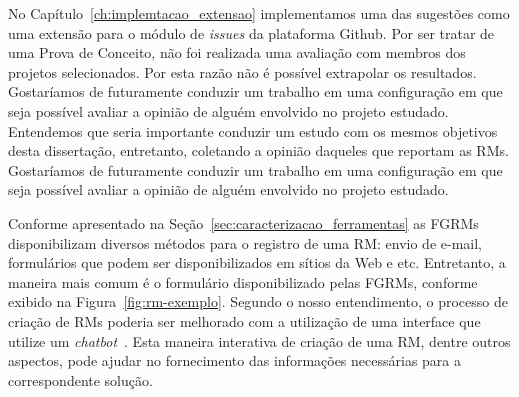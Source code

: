 No Capítulo~\ref{ch:implemtacao_extensao} implementamos uma das sugestões como
uma extensão para o módulo de \textit{issues} da plataforma Github. Por ser
tratar de uma Prova de Conceito, não foi realizada uma avaliação com membros dos
projetos selecionados. Por esta razão não é possível extrapolar os resultados.
Gostaríamos de futuramente conduzir um trabalho em uma configuração em que seja
possível avaliar a opinião de alguém envolvido no projeto estudado. Entendemos
que seria importante conduzir um estudo com os mesmos objetivos desta
dissertação, entretanto, coletando a opinião daqueles que reportam as RMs.
Gostaríamos de futuramente conduzir um trabalho em uma configuração em que seja
possível avaliar a opinião de alguém envolvido no projeto estudado.

Conforme apresentado na Seção~\ref{sec:caracterizacao_ferramentas} as FGRMs
disponibilizam diversos métodos para o registro de uma RM\@: envio de e-mail,
formulários que podem ser disponibilizados em sítios da Web e etc. Entretanto, a
maneira mais comum é o formulário disponibilizado pelas FGRMs, conforme exibido
na Figura~\ref{fig:rm-exemplo}. Segundo o nosso entendimento, o processo de
criação de RMs poderia ser melhorado com a utilização de uma interface que
utilize um \textit{chatbot}~\cite{mauldin1994chatterbots,huang2007extracting}.
Esta maneira interativa de criação de uma RM, dentre outros aspectos, pode
ajudar no fornecimento das informações necessárias para a correspondente
solução.
